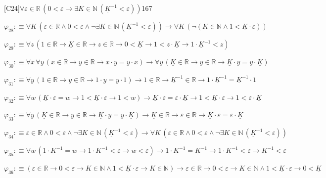 \begin{fullproof}{[C24]}{$\forall \varepsilon \in \mathbb{R}\,(0 < \varepsilon \to \exists K \in \mathbb{N}\,(\underline{K}^{-1} < \varepsilon))$}{167}
\begin{abbrevlist}
\item $\varphi_{28} :\equiv \forall K\,(\varepsilon \in \mathbb{R} \land 0 < \varepsilon \land \neg \exists K \in \mathbb{N}\,(\underline{K}^{-1} < \varepsilon)) \to \forall K\,(\neg (K \in \mathbb{N} \land 1 < \underline{K} \cdot \varepsilon))$
\item $\varphi_{29} :\equiv \forall z\,(1 \in \mathbb{R} \to \underline{K} \in \mathbb{R} \to z \in \mathbb{R} \to 0 < \underline{K} \to 1 < z \cdot \underline{K} \to 1 \cdot \underline{K}^{-1} < z)$
\item $\varphi_{30} :\equiv \forall x\,\forall y\,(x \in \mathbb{R} \to y \in \mathbb{R} \to x \cdot y = y \cdot x) \to \forall y\,(\underline{K} \in \mathbb{R} \to y \in \mathbb{R} \to \underline{K} \cdot y = y \cdot \underline{K})$
\item $\varphi_{31} :\equiv \forall y\,(1 \in \mathbb{R} \to y \in \mathbb{R} \to 1 \cdot y = y \cdot 1) \to 1 \in \mathbb{R} \to \underline{K}^{-1} \in \mathbb{R} \to 1 \cdot \underline{K}^{-1} = \underline{K}^{-1} \cdot 1$
\item $\varphi_{32} :\equiv \forall w\,(\underline{K} \cdot \varepsilon = w \to 1 < \underline{K} \cdot \varepsilon \to 1 < w) \to \underline{K} \cdot \varepsilon = \varepsilon \cdot \underline{K} \to 1 < \underline{K} \cdot \varepsilon \to 1 < \varepsilon \cdot \underline{K}$
\item $\varphi_{33} :\equiv \forall y\,(\underline{K} \in \mathbb{R} \to y \in \mathbb{R} \to \underline{K} \cdot y = y \cdot \underline{K}) \to \underline{K} \in \mathbb{R} \to \varepsilon \in \mathbb{R} \to \underline{K} \cdot \varepsilon = \varepsilon \cdot \underline{K}$
\item $\varphi_{34} :\equiv \varepsilon \in \mathbb{R} \land 0 < \varepsilon \land \neg \exists K \in \mathbb{N}\,(\underline{K}^{-1} < \varepsilon) \to \forall K\,(\varepsilon \in \mathbb{R} \land 0 < \varepsilon \land \neg \exists K \in \mathbb{N}\,(\underline{K}^{-1} < \varepsilon))$
\item $\varphi_{35} :\equiv \forall w\,(1 \cdot \underline{K}^{-1} = w \to 1 \cdot \underline{K}^{-1} < \varepsilon \to w < \varepsilon) \to 1 \cdot \underline{K}^{-1} = \underline{K}^{-1} \to 1 \cdot \underline{K}^{-1} < \varepsilon \to \underline{K}^{-1} < \varepsilon$
\item $\varphi_{36} :\equiv (\varepsilon \in \mathbb{R} \to 0 < \varepsilon \to K \in \mathbb{N} \land 1 < \underline{K} \cdot \varepsilon \to K \in \mathbb{N}) \to \varepsilon \in \mathbb{R} \to 0 < \varepsilon \to K \in \mathbb{N} \land 1 < \underline{K} \cdot \varepsilon \to 0 < \underline{K}$

\end{abbrevlist}
\end{fullproof}
